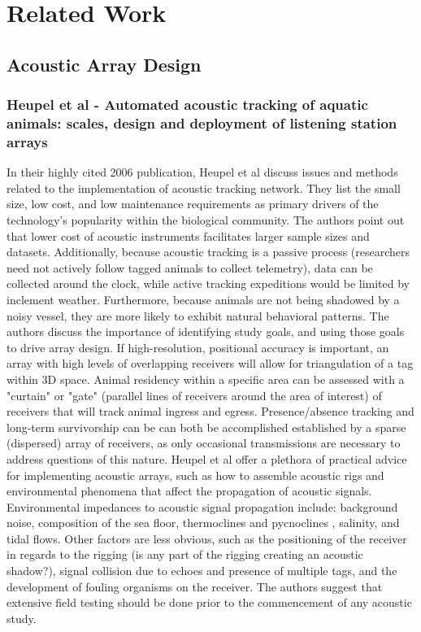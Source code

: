 \chapter{Related Work}

\section{Acoustic Array Design}
\subsection{Heupel et al - Automated acoustic tracking of aquatic animals: scales, design and deployment of listening station arrays}
In their highly cited 2006 publication\cite{Heupel2006}, Heupel et al discuss issues and methods related to the implementation of acoustic tracking network.  They list the small size, low cost, and low maintenance requirements as primary drivers of the technology's popularity within the biological community.  The authors point out that lower cost of acoustic instruments facilitates larger sample sizes and datasets.  Additionally, because acoustic tracking is a passive process (researchers need not actively follow tagged animals to collect telemetry), data can be collected around the clock, while active tracking expeditions would be limited by inclement weather.  Furthermore, because animals are not being shadowed by a noisy vessel, they are more likely to exhibit natural behavioral patterns.\newline
\newline
The authors discuss the importance of identifying study goals, and using those goals to drive array design.  If high-resolution, positional accuracy is important, an array with high levels of overlapping receivers will allow for triangulation of a tag within 3D space.  Animal residency within a specific area can be assessed with a "curtain" or "gate" (parallel lines of receivers around the area of interest) of receivers that will track animal ingress and egress.  Presence/absence tracking and long-term survivorship can be can both be accomplished established by a sparse (dispersed) array of receivers, as only occasional transmissions are necessary to address questions of this nature.\newline
\newline
Heupel et al offer a plethora of practical advice for implementing acoustic arrays, such as how to assemble acoustic rigs and environmental phenomena that affect the propagation of acoustic signals.  Environmental impedances to acoustic signal propagation include: background noise, composition of the sea floor, thermoclines and pycnoclines , salinity, and tidal flows.  Other factors are less obvious, such as the positioning of the receiver in regards to the rigging (is any part of the rigging creating an acoustic shadow?), signal collision due to echoes and presence of multiple tags, and the development of fouling organisms on the receiver.  The authors suggest that extensive field testing should be done prior to the commencement of any acoustic study.


